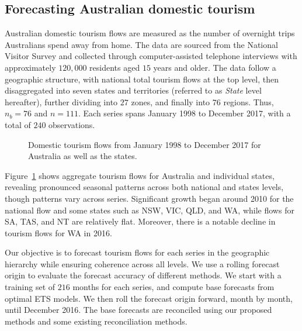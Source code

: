 \documentclass[
  11pt]{article}
\theoremstyle{plain}
\theoremstyle{remark}
\begin{document}
\subsection{Forecasting Australian domestic tourism}\label{sec-tourism}

Australian domestic tourism flows are measured as the number of
overnight trips Australians spend away from home. The data are sourced
from the National Visitor Survey and collected through computer-assisted
telephone interviews with approximately \(120,000\) residents aged
\(15\) years and older. The data follow a geographic structure, with
national total tourism flows at the top level, then disaggregated into
seven states and territories (referred to as \emph{State} level
hereafter), further dividing into \(27\) zones, and finally into \(76\)
regions. Thus, \(n_b=76\) and \(n=111\). Each series spans January 1998
to December 2017, with a total of \(240\) observations.

\begin{figure}


\caption{\label{fig-tourism-data}Domestic tourism flows from January
1998 to December 2017 for Australia as well as the states.}

\end{figure}%

Figure~\ref{fig-tourism-data} shows aggregate tourism flows for
Australia and individual states, revealing pronounced seasonal patterns
across both national and states levels, though patterns vary across
series. Significant growth began around 2010 for the national flow and
some states such as NSW, VIC, QLD, and WA, while flows for SA, TAS, and
NT are relatively flat. Moreover, there is a notable decline in tourism
flows for WA in 2016.

Our objective is to forecast tourism flows for each series in the
geographic hierarchy while ensuring coherence across all levels. We use
a rolling forecast origin to evaluate the forecast accuracy of different
methods. We start with a training set of \(216\) months for each series,
and compute base forecasts from optimal ETS models. We then roll the
forecast origin forward, month by month, until December 2016. The base
forecasts are reconciled using our proposed methods and some existing
reconciliation methods.
\end{document}
